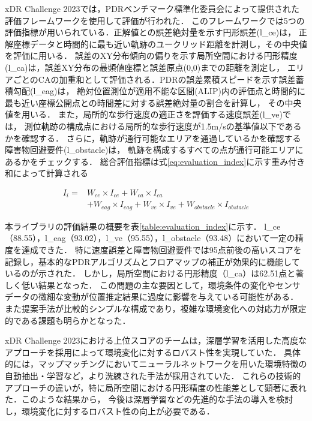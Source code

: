xDR Challenge 2023では，PDRベンチマーク標準化委員会によって提供された評価フレームワークを使用して評価が行われた．
このフレームワークでは5つの評価指標が用いられている．正解値との誤差絶対量を示す円形誤差(l\_ce)は，
正解座標データと時間的に最も近い軌跡のユークリッド距離を計測し，その中央値を評価に用いる．
誤差のXY分布傾向の偏りを示す局所空間における円形精度(l\_ca)は，誤差XY分布の最頻値座標と誤差原点(0,0)までの距離を測定し，
エリアごとのCAの加重和として評価される．PDRの誤差累積スピードを示す誤差蓄積勾配(l\_eag)は，
絶対位置測位が適用不能な区間(ALIP)内の評価点と時間的に最も近い座標公開点との時間差に対する誤差絶対量の割合を計算し，
その中央値を用いる．
また，局所的な歩行速度の適正さを評価する速度誤差(l\_ve)では，
測位軌跡の構成点における局所的な歩行速度が1.5m/sの基準値以下であるかを確認する．
さらに，軌跡が通行可能なエリアを通過しているかを確認する障害物回避要件(l\_obstacle)は，
軌跡を構成するすべての点が通行可能エリアにあるかをチェックする．
総合評価指標は式\ref{eq:evaluation_index}に示す重み付き和によって計算される

\begin{equation}
	\begin{aligned}
		I_i = & W_{ce} \times I_{ce} + W_{ca} \times I_{ca}                                        \\
		      & + W_{eag} \times I_{eag} + W_{ve} \times I_{ve} + W_{obstacle} \times I_{obstacle}
	\end{aligned}
	\label{eq:evaluation_index}
\end{equation}

本ライブラリの評価結果の概要を表\ref{table:evaluation_index}に示す．
l\_ce（88.55），l\_eag（93.02），l\_ve（95.55），l\_obstacle（93.48）において一定の精度を達成できた．
特に速度誤差と障害物回避要件では95点前後の高いスコアを記録し，基本的なPDRアルゴリズムとフロアマップの補正が効果的に機能しているのが示された．
しかし，局所空間における円形精度（l\_ca）は62.51点と著しく低い結果となった．
この問題の主な要因として，環境条件の変化やセンサデータの微細な変動が位置推定結果に過度に影響を与えている可能性がある．
また提案手法が比較的シンプルな構成であり，複雑な環境変化への対応力が限定的である課題も明らかとなった．

xDR Challenge 2023における上位スコアのチームは，深層学習を活用した高度なアプローチを採用によって環境変化に対するロバスト性を実現していた．
具体的には，マップマッチングにおいてニューラルネットワークを用いた環境特徴の自動抽出・学習など，より洗練された手法が採用されていた．
これらの技術的アプローチの違いが，特に局所空間における円形精度の性能差として顕著に表れた．このような結果から，
今後は深層学習などの先進的な手法の導入を検討し，環境変化に対するロバスト性の向上が必要である．



